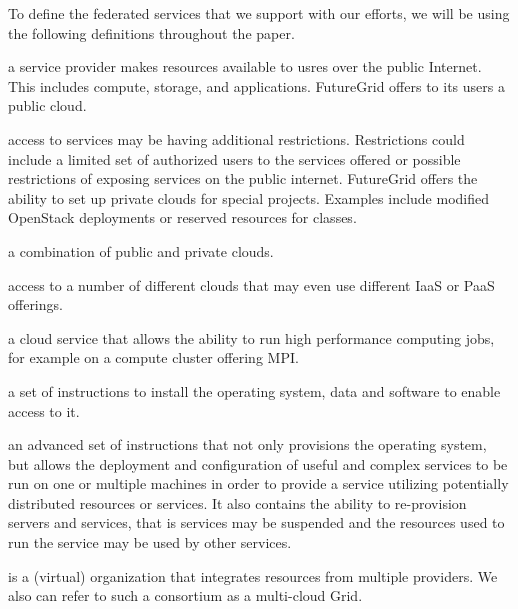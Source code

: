 \documentclass{tex/sig-alternate}
\begin{document}
To define the federated services that we support with our efforts, we will be
using the following definitions throughout the paper.

\begin{description}
   \setlength{\itemsep}{0pt}
   \setlength{\parsep}{0pt}

\item[public-cloud:]  a service provider makes resources available to
  usres over the public Internet. This includes compute, storage, and
  applications. FutureGrid offers to its users a public cloud. 

\item[private-cloud:] access to services may be having additional
  restrictions. Restrictions could include a limited set of authorized
  users to the services offered or  possible restrictions of exposing services on the public
  internet. FutureGrid offers the ability to set up private clouds for
  special projects. Examples include modified OpenStack deployments or
  reserved resources for classes.

\item[hybrid-cloud:] a combination of public and private clouds. 

\item[multi-cloud:] access to a number of different clouds that may
  even use different IaaS or PaaS offerings. 

\item[hpc-service:] a cloud service that allows the ability to run high
  performance computing jobs, for example on a compute cluster
  offering MPI. 

\item[provisioning:] a set of instructions to install the operating
  system, data and software to enable access to it. 

\item[rain:] an advanced set of instructions that not only provisions
  the operating system, but allows the deployment and configuration of
  useful and complex services to be run on one or multiple machines in
  order to provide a service utilizing potentially distributed
  resources or services.  It also contains the ability to re-provision
  servers and services, that is services may be suspended and the
  resources used to run the service may be used by other services.

\item[provider consortium:] is a (virtual) organization that
  integrates resources from multiple providers. We also can refer to
  such a consortium as a multi-cloud Grid.

\end{description}
\end{document}
